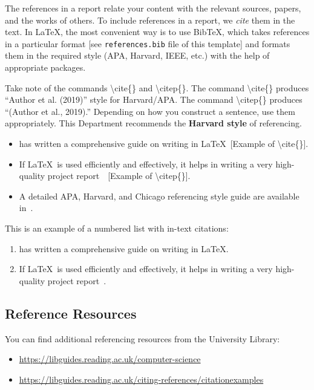The references in a report relate your content with the relevant sources, papers, 
and the works of others. To include references in a report, we \textit{cite} them 
in the text. In \LaTeX, the most convenient way is to use BibTeX, which takes 
references in a particular format [see \texttt{references.bib} file of this 
template] and formats them in the required style (APA, Harvard, IEEE, etc.) 
with the help of appropriate packages.

Take note of the commands \textbackslash cite\{\} and \textbackslash citep\{\}. 
The command \textbackslash cite\{\} produces ``Author et al. (2019)'' style for 
Harvard/APA. The command \textbackslash citep\{\} produces ``(Author et al., 2019).'' 
Depending on how you construct a sentence, use them appropriately. 
This Department recommends the \textbf{Harvard style} of referencing.

\begin{itemize}
    \item \cite{kottwitzlatex2021} has written a comprehensive guide on writing 
    in \LaTeX~[Example of \textbackslash cite\{\}].
    \item If \LaTeX~is used efficiently and effectively, it helps in writing a 
    very high-quality project report~\citep{lamport1994latex}~[Example of 
    \textbackslash citep\{\}].
    \item A detailed APA, Harvard, and Chicago referencing style guide are 
    available in~\citep{uor_refernce_style}.
\end{itemize}

\noindent This is an example of a numbered list with in-text citations:
\begin{enumerate}
    \item \cite{kottwitzlatex2021} has written a comprehensive guide on writing 
    in \LaTeX.
    \item If \LaTeX~is used efficiently and effectively, it helps in writing a 
    very high-quality project report~\citep{lamport1994latex}.
\end{enumerate}

\subsection{Reference Resources}
\label{subsec:reflinks}
You can find additional referencing resources from the University Library:
\begin{itemize}
    \item \url{https://libguides.reading.ac.uk/computer-science}
    \item \url{https://libguides.reading.ac.uk/citing-references/citationexamples}
\end{itemize}

